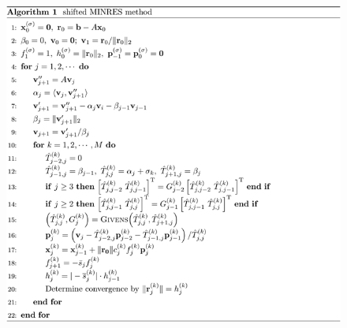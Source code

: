 \vspace{0.5em}
\begin{figure}[H]
	\centering
	\includegraphics[scale=2.2]{./fig/algorithm-sminres.png}
\end{figure}


